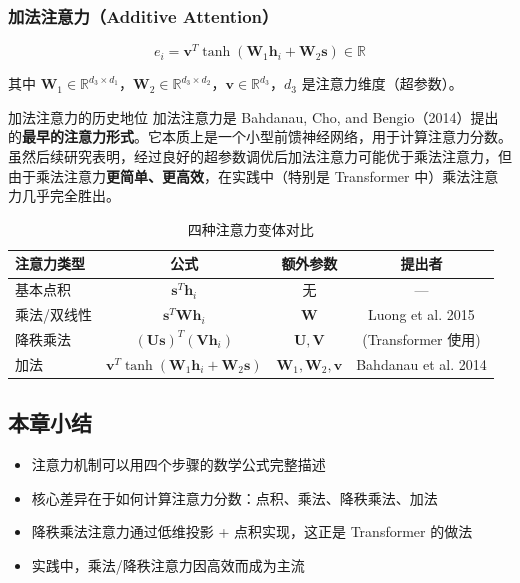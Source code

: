 \subsubsection{加法注意力（Additive Attention）}

$$e_i = \mathbf{v}^T \tanh(\mathbf{W}_1 \mathbf{h}_i + \mathbf{W}_2 \mathbf{s}) \in \mathbb{R}$$

其中 $\mathbf{W}_1 \in \mathbb{R}^{d_3 \times d_1}$，$\mathbf{W}_2 \in \mathbb{R}^{d_3 \times d_2}$，$\mathbf{v} \in \mathbb{R}^{d_3}$，$d_3$ 是注意力维度（超参数）。

\begin{knowledgebox}{加法注意力的历史地位}
加法注意力是 Bahdanau, Cho, and Bengio（2014）提出的\textbf{最早的注意力形式}。它本质上是一个小型前馈神经网络，用于计算注意力分数。虽然后续研究表明，经过良好的超参数调优后加法注意力可能优于乘法注意力，但由于乘法注意力\textbf{更简单、更高效}，在实践中（特别是 Transformer 中）乘法注意力几乎完全胜出。
\end{knowledgebox}

\begin{table}[H]
\centering
\begin{tabular}{lccc}
\toprule
\textbf{注意力类型} & \textbf{公式} & \textbf{额外参数} & \textbf{提出者} \\
\midrule
基本点积 & $\mathbf{s}^T \mathbf{h}_i$ & 无 & --- \\
乘法/双线性 & $\mathbf{s}^T \mathbf{W} \mathbf{h}_i$ & $\mathbf{W}$ & Luong et al. 2015 \\
降秩乘法 & $(\mathbf{U}\mathbf{s})^T(\mathbf{V}\mathbf{h}_i)$ & $\mathbf{U}, \mathbf{V}$ & (Transformer 使用) \\
加法 & $\mathbf{v}^T \tanh(\mathbf{W}_1 \mathbf{h}_i + \mathbf{W}_2 \mathbf{s})$ & $\mathbf{W}_1, \mathbf{W}_2, \mathbf{v}$ & Bahdanau et al. 2014 \\
\bottomrule
\end{tabular}
\caption{四种注意力变体对比}
\end{table}

\subsection{本章小结}

\begin{itemize}
    \item 注意力机制可以用四个步骤的数学公式完整描述
    \item 核心差异在于如何计算注意力分数：点积、乘法、降秩乘法、加法
    \item 降秩乘法注意力通过低维投影 + 点积实现，这正是 Transformer 的做法
    \item 实践中，乘法/降秩注意力因高效而成为主流
\end{itemize}


